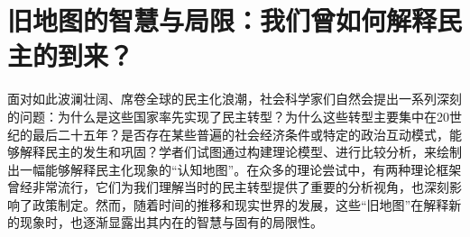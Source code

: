 \documentclass[UTF8, 10pt]{ctexbook}
\begin{document}
\section{旧地图的智慧与局限：我们曾如何解释民主的到来？}

\lettrine[lines=2]{面}{对}如此波澜壮阔、席卷全球的民主化浪潮，社会科学家们自然会提出一系列深刻的问题：为什么是这些国家率先实现了民主转型？为什么这些转型主要集中在20世纪的最后二十五年？是否存在某些普遍的社会经济条件或特定的政治互动模式，能够解释民主的发生和巩固？学者们试图通过构建理论模型、进行比较分析，来绘制出一幅能够解释民主化现象的“认知地图”。在众多的理论尝试中，有两种理论框架曾经非常流行，它们为我们理解当时的民主转型提供了重要的分析视角，也深刻影响了政策制定。然而，随着时间的推移和现实世界的发展，这些“旧地图”在解释新的现象时，也逐渐显露出其内在的智慧与固有的局限性。
\end{document}
